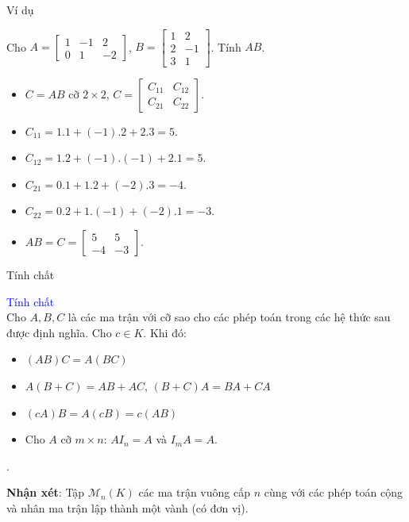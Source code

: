 \documentclass[pdf,10pt]{beamer}
\begin{document}
\begin{frame}{Ví dụ}
	
	Cho $A = \left[ 
	\begin{array}{rrr}
		1 & -1 & 2  \\
		0 & 1 & -2 
	\end{array}
	\right]$, 
	$B = \left[
	\begin{array}{rr}
		1 & 2 \\
		2 & -1 \\
		3 & 1 
	\end{array}
	\right]$.
	Tính $AB$.
	\begin{itemize}
		\item $C = AB$ cỡ $2 \times 2$, $C = \left[ \begin{array}{rr}
			C_{11}  & C_{12} \\
			C_{21} & C_{22} 
		\end{array}
		\right] $.
		\item $C_{11}=1.1+(-1).2+2.3=5 .$
		\item $C_{12}=1.2+(-1).(-1)+2.1=5 .$
		\item $C_{21}=0.1+1.2+(-2).3=-4 .$
		\item $C_{22}=0.2+1.(-1)+(-2).1=-3 .$
		\item $AB=C= \left[ 
		\begin{array}{rr}
			5     &  5 \\
			-4     & -3 
		\end{array}
		\right] $.
	\end{itemize}
\end{frame}

\begin{frame}{Tính chất}
\begin{tcolorbox}
\textcolor{blue}{Tính chất} \\[2mm]
Cho $A,B,C$ là các ma trận với cỡ sao cho các phép toán trong các hệ thức sau được định nghĩa. Cho $c \in K$. Khi đó:
\begin{itemize}
	\item $(AB)C=A(BC)$
	\item $A(B+C)=AB+AC$, $(B+C)A=BA+CA$
	\item $(cA)B=A(cB)=c(AB)$
	\item Cho $A$ cỡ $m \times n$: $AI_{n} = A$ và $I_{m} A = A$.
\end{itemize}.
\end{tcolorbox}
\textbf{Nhận xét}: Tập $\mathcal{M}_{n}(K)$ các ma trận vuông cấp $n$ cùng với các phép toán cộng và nhân ma trận lập thành một vành (có đơn vị).
\end{frame}
\end{document}
